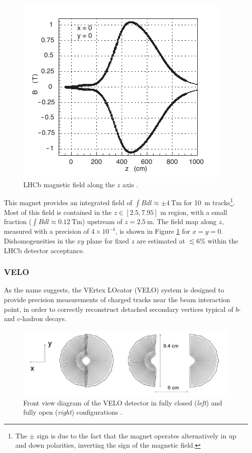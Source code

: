 \begin{figure}[t]
	\centering
	\includegraphics[width=.6\textwidth]{graphics/02-lhcb/b_field_map_z.png}
	\caption[LHCb magnetic field along the $z$ axis.]{LHCb magnetic field along the $z$ axis \cite{Amato:424338}.}
	\label{fig:2:b_field_map_z}
\end{figure}

This magnet provides an integrated field of $\int B dl \approx \pm \SI{4}{\tesla\meter}$ for \SI{10}{\meter} tracks\footnote{The $\pm$ sign is due to the fact that the magnet operates alternatively in up and down polarities, inverting the sign of the magnetic field.}.
Most of this field is contained in the $z\in[2.5,7.95]$ \si{\meter} region, with 
a small fraction ($\int B dl \approx \SI{0.12}{\tesla\meter}$) upstream of $z=\SI{2.5}{\meter}$. The field map along $z$, measured with a precision of $4 \times {10}^{-4}$, is shown in Figure \ref{fig:2:b_field_map_z} for $x=y=0$.
Dishomogeneities in the $xy$ plane for fixed $z$ are estimated at $\lesssim 6\%$ within the LHCb detector acceptance.

\subsubsection{VELO}
As the name suggests, the VErtex LOcator (VELO) system \cite{Barbosa-Marinho:504321} is designed to provide precision measurements of charged tracks near the beam interaction point, in order to correctly reconstruct detached secondary vertices typical of $b$- and $c$-hadron decays.

\begin{figure}[t]
	\centering
	\includegraphics[width=\textwidth]{graphics/02-lhcb/VELO_xy.png}
	\caption[Front view diagram of the VELO detector.]{Front view diagram of the VELO detector in fully closed (\textit{left}) and fully open (\textit{right}) configurations \cite{Barbosa-Marinho:504321}.}
	\label{fig:2:VELO_xy}
\end{figure}

